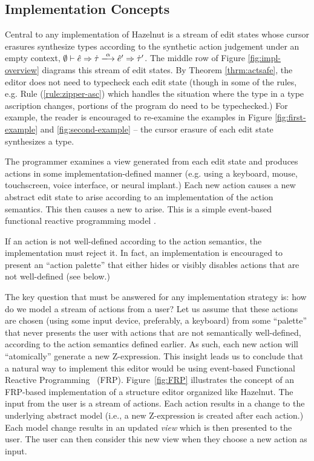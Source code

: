 \subsection{Implementation Concepts}
Central to any implementation of Hazelnut is a stream of edit states whose cursor erasures synthesize types according to the synthetic action judgement under an empty context, $\performSyn{\emptyset}{\zexp}{\htau}{\alpha}{\zexp'}{\htau'}$. The middle row of Figure \ref{fig:impl-overview} diagrams this stream of edit states. By Theorem \ref{thrm:actsafe}, the editor does not need to typecheck each edit state (though in some of the rules, e.g. Rule (\ref{rule:zipper-asc}) which handles the situation where the type in a type ascription changes, portions of the program do need to be typechecked.) For example, the reader is encouraged to re-examine the examples in Figure \ref{fig:first-example} and \ref{fig:second-example} -- the cursor erasure of each edit state synthesizes a type.

The programmer examines a view generated from each edit state and produces actions in some implementation-defined manner (e.g. using a keyboard, mouse, touchscreen, voice interface, or neural implant.) Each new action causes a new abstract edit state to arise according to an implementation of the action semantics. This then causes a new to arise. This is a simple event-based functional reactive programming model \cite{Wan:2000:FRP:349299.349331}. 

If an action is not well-defined according to the action semantics, the implementation must reject it. In fact, an implementation is encouraged to present an ``action palette'' that either hides or visibly disables actions that are not well-defined (see below.)



The key question that must be answered for any implementation strategy is: how do we model a stream of actions from a user? Let us assume that these actions are chosen (using some input device, preferably, a keyboard) from some ``palette'' that never presents the user with actions that are not semantically well-defined, according to the action semantics defined earlier.
As such, each new action will ``atomically'' generate a new Z-expression. 
This insight leads us to conclude that a natural way to implement this editor would be using event-based Functional Reactive Programming~\cite{Wan:2000:FRP:349299.349331} (FRP).
Figure~\ref{fig:FRP} illustrates the concept of an FRP-based implementation of a  structure editor organized like Hazelnut.
The input from the user is a stream of actions.  Each action results in a change to the underlying abstract model (i.e., a new Z-expression is created after each action.)
Each model change results in an updated \emph{view} which is then presented to the user.  The user can then consider this new view when they choose a new action as input.

